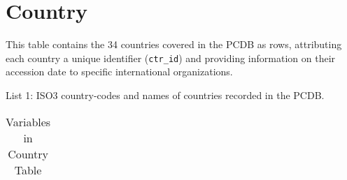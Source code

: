 \section{Country}\label{sec_country}
This table contains the 34 countries covered in the PCDB as rows, attributing each country a unique identifier (\texttt{\footnotesize ctr\_id}) and providing information on their accession date to specific international organizations. 

\begin{table}[h!]
\centering
\caption*{List 1: ISO3 country-codes and names of countries recorded in the PCDB.}

\end{table}


\begin{center}
\begin{longtable}{L{4cm} L{6cm} L{3cm}}
\caption{Variables in Country Table\label{tab_country}}


\end{longtable}
\end{center}


